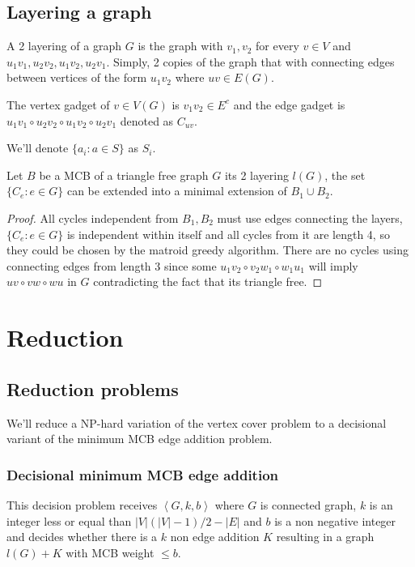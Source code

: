 \subsection{Layering a graph}
\begin{definition}
    A 2 layering of a graph $G$ is the graph with $v_1,v_2$ for every $v\in V$ and $u_1v_1,u_2v_2,u_1v_2,u_2v_1$. Simply, 2 copies of the graph that with connecting edges between vertices of the form $u_1v_2$ where $uv\in E(G)$.
\end{definition}
\begin{definition}
    The vertex gadget of $v\in V(G)$ is $v_1v_2\in E^c$ and the edge gadget is $u_1v_1\circ u_2v_2\circ u_1v_2\circ u_2v_1$ denoted as $C_{uv}$.
\end{definition}
We'll denote $\{a_i:a\in S\}$ as $S_i$.
\begin{lemma}\label{gadget set expansion}
    Let $B$ be a MCB of a triangle free graph $G$ its 2 layering $l(G)$, the set $\{C_e:e\in G\}$ can be extended into a minimal extension of $B_1\cup B_2$.
\end{lemma}
\begin{proof}
    All cycles independent from $B_1,B_2$ must use edges connecting the layers, $\{C_e:e\in G\}$ is independent within itself and all cycles from it are length 4, so they could be chosen by the matroid greedy algorithm.
    There are no cycles using connecting edges from length 3 since some $u_1v_2\circ v_2w_1\circ w_1u_1$ will imply $uv\circ vw\circ wu$ in $G$ contradicting the fact that its triangle free.
\end{proof}








\section{Reduction}
\subsection{Reduction problems}
We'll reduce a NP-hard variation of the vertex cover problem to a decisional variant of the minimum MCB edge addition problem.
\subsubsection{Decisional minimum MCB edge addition}
This decision problem receives $\left<G,k,b\right>$ where $G$ is connected graph, $k$ is an integer less or equal than $|V|(|V|-1)/2-|E|$ and $b$ is a non negative integer and decides whether there is a $k$ non edge addition  $K$ resulting in a  graph $l(G)+K$ with MCB weight $\leq b$.

